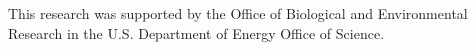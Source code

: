 \documentclass[portait,custom]{sciposter}
\begin{document}
\begin{multicols*}{4}

\smallskip
\vbox{\small
This research was supported by the Office of Biological and Environmental 
Research in the U.S. Department of Energy Office of Science. }


\vfill


\end{multicols*}
\end{document}
